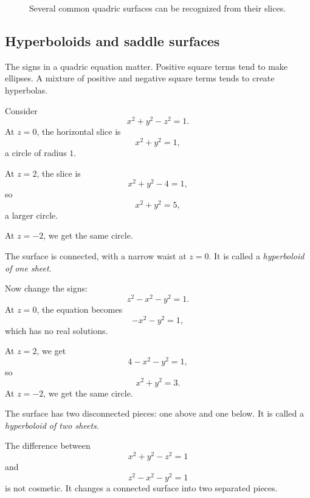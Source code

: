 \begin{figure}[h]
\caption{Several common quadric surfaces can be recognized from their slices.}
\end{figure}

\subsection{Hyperboloids and saddle surfaces}

The signs in a quadric equation matter.  Positive square terms tend to make ellipses.
A mixture of positive and negative square terms tends to create hyperbolas.

\begin{example}
Consider
\[
    x^2+y^2-z^2=1.
\]
At \(z=0\), the horizontal slice is
\[
    x^2+y^2=1,
\]
a circle of radius \(1\).

At \(z=2\), the slice is
\[
    x^2+y^2-4=1,
\]
so
\[
    x^2+y^2=5,
\]
a larger circle.

At \(z=-2\), we get the same circle.

The surface is connected, with a narrow waist at \(z=0\).  It is called a
\emph{hyperboloid of one sheet}.
\end{example}

\begin{example}
Now change the signs:
\[
    z^2-x^2-y^2=1.
\]
At \(z=0\), the equation becomes
\[
    -x^2-y^2=1,
\]
which has no real solutions.

At \(z=2\), we get
\[
    4-x^2-y^2=1,
\]
so
\[
    x^2+y^2=3.
\]
At \(z=-2\), we get the same circle.

The surface has two disconnected pieces: one above and one below.  It is called a
\emph{hyperboloid of two sheets}.
\end{example}

The difference between
\[
    x^2+y^2-z^2=1
\]
and
\[
    z^2-x^2-y^2=1
\]
is not cosmetic.  It changes a connected surface into two separated pieces.

